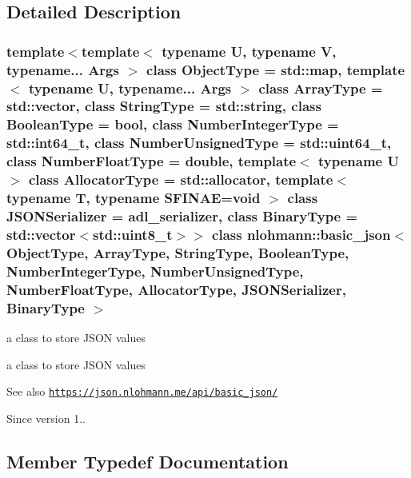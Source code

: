 \subsection{Detailed Description}
\subsubsection*{template$<$template$<$ typename U, typename V, typename... Args $>$ class Object\+Type = std\+::map, template$<$ typename U, typename... Args $>$ class Array\+Type = std\+::vector, class String\+Type = std\+::string, class Boolean\+Type = bool, class Number\+Integer\+Type = std\+::int64\+\_\+t, class Number\+Unsigned\+Type = std\+::uint64\+\_\+t, class Number\+Float\+Type = double, template$<$ typename U $>$ class Allocator\+Type = std\+::allocator, template$<$ typename T, typename S\+F\+I\+N\+A\+E=void $>$ class J\+S\+O\+N\+Serializer = adl\+\_\+serializer, class Binary\+Type = std\+::vector$<$std\+::uint8\+\_\+t$>$$>$\newline
class nlohmann\+::basic\+\_\+json$<$ Object\+Type, Array\+Type, String\+Type, Boolean\+Type, Number\+Integer\+Type, Number\+Unsigned\+Type, Number\+Float\+Type, Allocator\+Type, J\+S\+O\+N\+Serializer, Binary\+Type $>$}

a class to store J\+S\+ON values 

a class to store J\+S\+ON values \begin{DoxySeeAlso}{See also}
\href{https://json.nlohmann.me/api/basic_json/}{\tt https\+://json.\+nlohmann.\+me/api/basic\+\_\+json/}
\end{DoxySeeAlso}


\begin{DoxySince}{Since}
version 1.. 
\end{DoxySince}


\subsection{Member Typedef Documentation}
\mbox{\label{classnlohmann_1_1basic__json_a858c1cf8407bc06494e3a1114a3b73e7}} 

